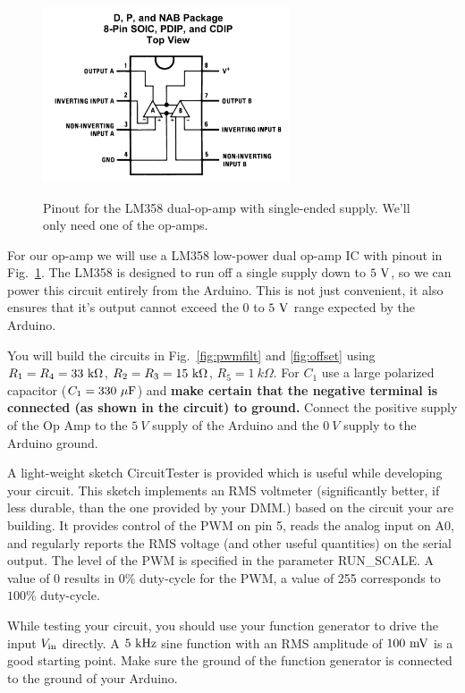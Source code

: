 \documentclass[12pt]{article}
\begin{document}
\begin{figure}[htbp]
\begin{center}
{\includegraphics[width=0.65\textwidth]{figs/lm358.png}}
\end{center}
\caption{\label{fig:lm358} Pinout for the LM358 dual-op-amp with single-ended supply.  We'll only need one of the op-amps.}
\end{figure}

For our op-amp we will use a LM358 low-power dual op-amp IC with pinout in Fig.~\ref{fig:lm358}.
The LM358 is designed to run off a single supply down to $5~\rm V$, so we can power this circuit entirely from the Arduino.  This is not just convenient, it also ensures that it's output cannot exceed the $0$ to $5~\rm V$ range expected by the Arduino.

You will build the circuits in Fig.~\ref{fig:pwmfilt}  and \ref{fig:offset} using $R_1 = R_4 = 33~\rm k\Omega$, $R_2 = R_3 = 15~\rm k\Omega$, $R_5=1~k\Omega$.  For $C_1$ use a large polarized capacitor ($C_1=330~\rm  \mu F$) and {\bf make certain that the negative terminal is connected (as shown in the circuit) to ground.}  Connect the positive supply of the Op Amp to the $5~V$ supply of the Arduino and the $0~V$ supply to the Arduino ground.  

A light-weight sketch {\rm CircuitTester} is provided which is useful while developing your circuit.  This sketch implements an RMS voltmeter (significantly better, if less durable, than the one provided by your DMM.) based on the circuit your are building.  It provides control of the PWM on pin 5, reads the analog input on A0, and regularly reports the RMS voltage (and other useful quantities) on the serial output.
The level of the PWM is specified in the parameter {\rm RUN\_SCALE}.  A value of 0 results in $0\%$ duty-cycle for the PWM, a value of 255 corresponds to $100\%$ duty-cycle.

While testing your circuit, you should use your function generator to drive the input $V_{\rm in}$ directly.  A $5~\rm kHz$ sine function with an RMS amplitude of $100~\rm mV$ is a good starting point.  Make sure the ground of the function generator is connected to the ground of your Arduino.
\end{document}
